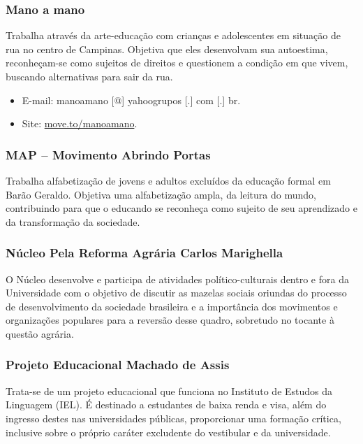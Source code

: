 \subsubsection{Mano a mano}

Trabalha através da arte-educação com crianças e adolescentes em situação de rua
no centro de Campinas. Objetiva que eles desenvolvam sua autoestima,
reconheçam-se como sujeitos de direitos e questionem a condição em que vivem,
buscando alternativas para sair da rua.

\begin{itemize}
\item  E-mail: manoamano [@] yahoogrupos [.] com [.] br.
\item  Site: \url{move.to/manoamano}.
\end{itemize}

\subsubsection{MAP -- Movimento Abrindo Portas}

Trabalha alfabetização de jovens e adultos excluídos da educação formal em Barão
Geraldo. Objetiva uma alfabetização ampla, da leitura do mundo, contribuindo
para que o educando se reconheça como sujeito de seu aprendizado e da
transformação da sociedade.

\subsubsection{Núcleo Pela Reforma Agrária Carlos Marighella}

O Núcleo desenvolve e participa de atividades político-culturais dentro e fora
da Universidade com o objetivo de discutir as mazelas sociais oriundas do
processo de desenvolvimento da sociedade brasileira e a importância dos
movimentos e organizações populares para a reversão desse quadro, sobretudo no
tocante à questão agrária.

\subsubsection{Projeto Educacional Machado de Assis}

Trata-se de um projeto educacional que funciona no Instituto de Estudos da
Linguagem (IEL). É destinado a estudantes de baixa renda e visa, além do
ingresso destes nas universidades públicas, proporcionar uma formação crítica,
inclusive sobre o próprio caráter excludente do vestibular e da universidade.

